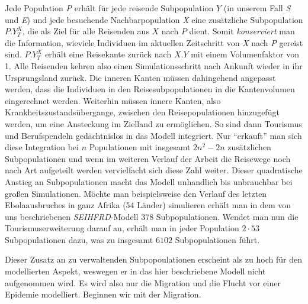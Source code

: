 Jede Population \emph{P} erhält für jede reisende Subpopulation $Y$ (in unserem Fall \emph{S} und \emph{E}) und jede besuchende Nachbarpopulation \emph{X} eine zusätzliche Subpopulation $P.Y^X_T$, die als Ziel für alle Reisenden aus $X$ nach $P$ dient. Somit \emph{konserviert} man die Information, wieviele Individuen im aktuellen Zeitschritt von \emph{X} nach \emph{P} gereist sind. $P.Y^X_T$ erhält eine Reisekante zurück nach $X.Y$ mit einem Volumenfaktor von 1. Alle Reisenden kehren also einen Simulationsschritt nach Ankunft wieder in ihr Ursprungsland zurück. Die inneren Kanten müssen dahingehend angepasst werden, dass die Individuen in den Reisesubpopulationen in die Kantenvolumen eingerechnet werden. Weiterhin müssen innere Kanten, also Krankheitszustandsübergange, zwischen den Reisepopulationen hinzugefügt werden, um eine Ansteckung im Zielland zu ermöglichen. So sind dann Tourismus und Berufspendeln gedächtnislos in das Modell integriert. Nur ``erkauft'' man sich diese Integration bei $n$ Populationen mit insgesamt $2n^2-2n$ zusätzlichen Subpopulationen und wenn im weiteren Verlauf der Arbeit die Reisewege noch nach Art aufgeteilt werden vervielfacht sich diese Zahl weiter. Dieser quadratische Anstieg an Subpopulationen macht das Modell unhandlich bis unbrauchbar bei großen Simulationen. Möchte man beispielsweise den Verlauf des letzten Ebolaausbruches in ganz Afrika (54 Länder) simulieren erhält man in dem von uns beschriebenen \emph{SEIHFRD}-Modell $378$ Subpopulationen. Wendet man nun die Tourismuserweiterung darauf an, erhält man in jeder Population $2\cdot 53$ Subpopulationen dazu, was zu insgesamt $6102$ Subpopulationen führt. 

Dieser Zusatz an zu verwaltenden Subpopoulationen erscheint als zu hoch für den modellierten Aspekt, weswegen er in das hier beschriebene Modell nicht aufgenommen wird. Es wird also nur die Migration und die Flucht vor einer Epidemie modelliert. Beginnen wir mit der Migration. 

